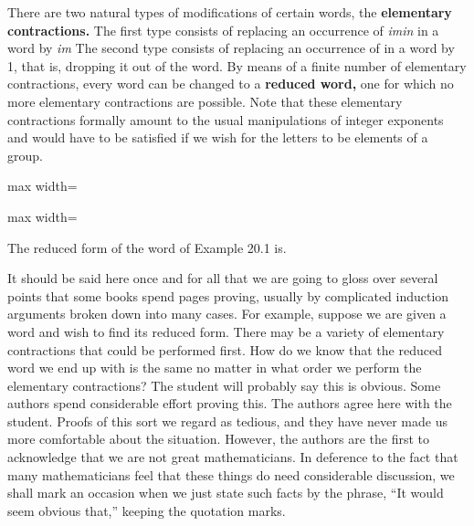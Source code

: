 \documentclass[11pt,oneside]{article}
\begin{document}
\BookNarrativetrue

\begin{BookBody}

There are two natural types of modifications of certain words, the\textbf{ elementary con}\textbf{tractions.} The first type consists of replacing an occurrence of \textit{im}\textit{in} in a word by \textit{im} The second type consists of replacing an occurrence of  in a word by 1, that is, dropping it out of the word. By means of a finite number of elementary contractions, every word can be changed to a\textbf{ reduced word,} one for which no more elementary contractions are possible. Note that these elementary contractions formally amount to the usual manipulations of integer exponents and would have to be satisfied if we wish for the letters to be elements of a group.

\begin{center}\begin{adjustbox}{max width=\linewidth}\end{adjustbox}\end{center}

\begin{center}\begin{adjustbox}{max width=\linewidth}\end{adjustbox}\end{center}

 The reduced form of the word of Example 20.1 is. \BookEnd{\blacktriangle}

It should be said here once and for all that we are going to gloss over several points that some books spend pages proving, usually by complicated induction arguments broken down into many cases. For example, suppose we are given a word and wish to find its reduced form. There may be a variety of elementary contractions that could be performed first. How do we know that the reduced word we end up with is the same no matter in what order we perform the elementary contractions? The student will probably say this is obvious. Some authors spend considerable effort proving this. The authors agree here with the student. Proofs of this sort we regard as tedious, and they have never made us more comfortable about the situation. However, the authors are the first to acknowledge that we are not great mathematicians. In deference to the fact that many mathematicians feel that these things do need considerable discussion, we shall mark an occasion when we just state such facts by the phrase, “It would seem obvious that,” keeping the quotation marks.


\end{BookBody}
\end{document}
